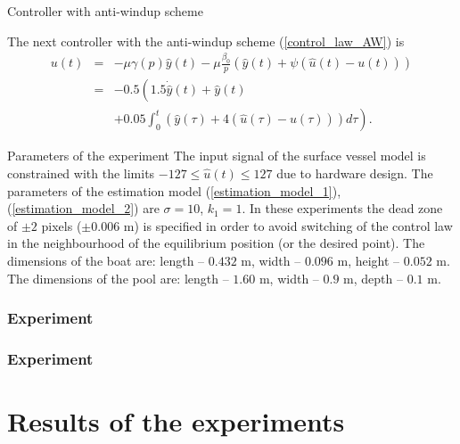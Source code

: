 \documentclass[10pt,pdf,hyperref={unicode}]{beamer}
\begin{document}
\begin{frame}{Controller with anti-windup scheme}

The next controller with the anti-windup scheme (\ref{control_law_AW}) is
\begin{eqnarray}
\label{control_law_AW_experiment}
u(t)&=&-\mu\gamma(p)\hat y(t)-\mu\frac{\beta_0}{p}(\hat y(t)+\psi(\hat u(t)-u(t)))\nonumber\\
&=&-0.5\left(1.5\dot{\hat y}(t)+\hat y(t)\right.\nonumber\\
&&\left.+0.05\int_0^t(\hat y(\tau)+4(\hat u(\tau)-u(\tau)))d\tau\right).
\end{eqnarray}

\begin{block}{Parameters of the experiment}
The input signal of the surface vessel model is constrained with the limits $-127\le\hat u(t)\le 127$ due to hardware design. The parameters of the estimation model (\ref{estimation_model_1}), (\ref{estimation_model_2}) are $\sigma=10$, $k_1=1$. In these experiments the dead zone of $\pm 2$ pixels ($\pm 0.006\mbox{ m}$) is specified in order to avoid switching of the control law in the neighbourhood of the equilibrium position (or the desired point). The dimensions of the boat are: length -- $0.432\mbox{ m}$, width -- $0.096\mbox{ m}$, height -- $0.052\mbox{ m}$. The dimensions of the pool are: length -- $1.60\mbox{ m}$, width -- $0.9\mbox{ m}$, depth -- $0.1\mbox{ m}$.
\end{block}

\end{frame}


\begin{frame}
	\frametitle{Experiment}
	\begin{figure}[ht]
		\setlength\fboxsep{0pt}
		\setlength\fboxrule{0.5pt}
		\fbox{
		
		}
		\label{fig:animation20}
	\end{figure}   
\end{frame}


\begin{frame}
	\frametitle{Experiment}
	\begin{figure}[ht]
		\setlength\fboxsep{0pt}
		\setlength\fboxrule{0.5pt}
		\fbox{
		
		}
		\label{fig:animation20}
	\end{figure}   
\end{frame}

\section{Results of the experiments}
\end{document}
